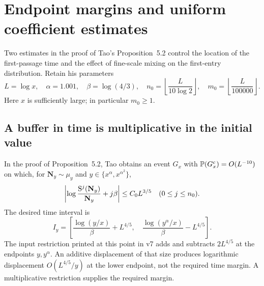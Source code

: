 \section{Endpoint margins and uniform coefficient estimates}\label{sec:repairs}

Two estimates in the proof of Tao's Proposition~5.2 control the location
of the first-passage time and the effect of fine-scale mixing on the
first-entry distribution.  Retain his parameters
\begin{equation}\label{eq:local-parameters}
 L=\log x,\quad \alpha=1.001,\quad \beta=\log(4/3),\quad
 n_0=\left\lfloor\frac{L}{10\log2}\right\rfloor,\quad
 m_0=\left\lfloor\frac{L}{100000}\right\rfloor.
\end{equation}
Here $x$ is sufficiently large; in particular $m_0\geq1$.

\subsection{A buffer in time is multiplicative in the initial value}

In the proof of Proposition~5.2, Tao obtains an event $G_x$ with
$\mathbb P(G_x^c)=O(L^{-10})$ on which, for
$\mathbf N_y\sim\mu_y$ and $y\in\{x^\alpha,x^{\alpha^2}\}$,
\begin{equation}\label{eq:orbit-log}
 \left|\log\frac{\mathrm S^j(\mathbf N_y)}{\mathbf N_y}
          +j\beta\right|\leq C_0L^{3/5}
 \quad(0\leq j\leq n_0).
\end{equation}
The desired time interval is
\[
 I_y=\left[\frac{\log(y/x)}\beta+L^{4/5},\quad
             \frac{\log(y^\alpha/x)}\beta-L^{4/5}\right].
\]
The input restriction printed at this point in v7 adds and subtracts
$2L^{4/5}$ at the endpoints $y,y^\alpha$.
An additive displacement of that size produces logarithmic displacement
$O(L^{4/5}/y)$ at the lower endpoint, not the required time margin.
A multiplicative restriction supplies the required margin.

